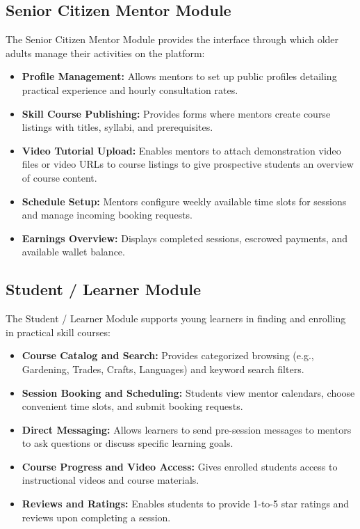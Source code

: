 \documentclass[12pt,a4paper]{report}
\begin{document}
\subsection{Senior Citizen Mentor Module}
The Senior Citizen Mentor Module provides the interface through which older adults manage their activities on the platform:
\begin{itemize}[leftmargin=1.5em, itemsep=2pt]
  \item \textbf{Profile Management:} Allows mentors to set up public profiles detailing practical experience and hourly consultation rates.
  \item \textbf{Skill Course Publishing:} Provides forms where mentors create course listings with titles, syllabi, and prerequisites.
  \item \textbf{Video Tutorial Upload:} Enables mentors to attach demonstration video files or video URLs to course listings to give prospective students an overview of course content.
  \item \textbf{Schedule Setup:} Mentors configure weekly available time slots for sessions and manage incoming booking requests.
  \item \textbf{Earnings Overview:} Displays completed sessions, escrowed payments, and available wallet balance.
\end{itemize}

\subsection{Student / Learner Module}
The Student / Learner Module supports young learners in finding and enrolling in practical skill courses:
\begin{itemize}[leftmargin=1.5em, itemsep=2pt]
  \item \textbf{Course Catalog and Search:} Provides categorized browsing (e.g., Gardening, Trades, Crafts, Languages) and keyword search filters.
  \item \textbf{Session Booking and Scheduling:} Students view mentor calendars, choose convenient time slots, and submit booking requests.
  \item \textbf{Direct Messaging:} Allows learners to send pre-session messages to mentors to ask questions or discuss specific learning goals.
  \item \textbf{Course Progress and Video Access:} Gives enrolled students access to instructional videos and course materials.
  \item \textbf{Reviews and Ratings:} Enables students to provide 1-to-5 star ratings and reviews upon completing a session.
\end{itemize}
\end{document}
